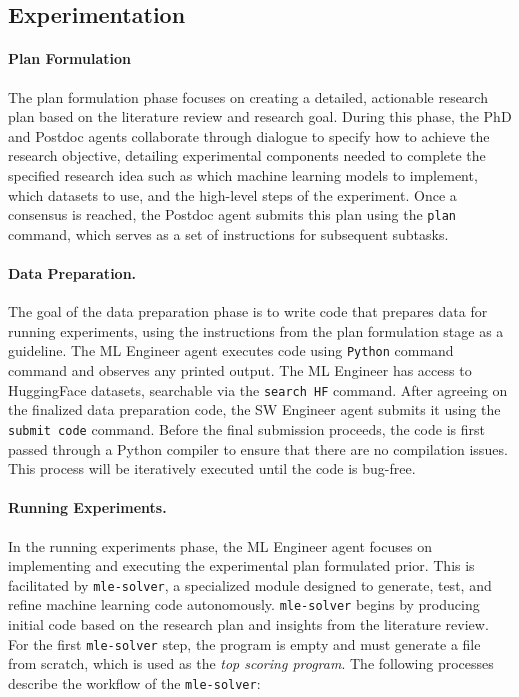 \documentclass[11pt, a4paper]{gdm_format}
\begin{document}
\subsection{Experimentation}
\label{sec:experimentation}
\paragraph{Plan Formulation} The plan formulation phase focuses on creating a detailed, actionable research plan based on the literature review and research goal. During this phase, the PhD and Postdoc agents collaborate through dialogue to specify how to achieve the research objective, detailing experimental components needed to complete the specified research idea such as which machine learning models to implement, which datasets to use, and the high-level steps of the experiment. Once a consensus is reached, the Postdoc agent submits this plan using the \texttt{plan} command, which serves as a set of instructions for subsequent subtasks.




\paragraph{Data Preparation.} The goal of the data preparation phase is to write code that prepares data for running experiments, using the instructions from the plan formulation stage as a guideline. The ML Engineer agent executes code using \texttt{Python} command command and observes any printed output. The ML Engineer has access to HuggingFace datasets, searchable via the \texttt{search HF} command. After agreeing on the finalized data preparation code, the SW Engineer agent submits it using the \texttt{submit code} command. Before the final submission proceeds, the code is first passed through a Python compiler to ensure that there are no compilation issues. This process will be iteratively executed until the code is bug-free.


\paragraph{Running Experiments.} In the running experiments phase, the ML Engineer agent focuses on implementing and executing the experimental plan formulated prior. This is facilitated by \texttt{mle-solver}, a specialized module designed to generate, test, and refine machine learning code autonomously. \texttt{mle-solver} begins by producing initial code based on the research plan and insights from the literature review. For the first \texttt{mle-solver} step, the program is empty and must generate a file from scratch, which is used as the \textit{top scoring program}. The following processes describe the workflow of the \texttt{mle-solver}:
\end{document}
